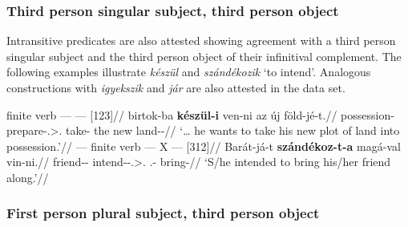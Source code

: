 \subsubsection{Third person singular subject, third person object}\label{sub:3-3}

Intransitive predicates are also attested showing agreement with a third person
singular subject and the third person object of their infinitival complement.
The following examples illustrate \emph{készül} and \emph{szándékozik}
\enquote*{to intend}. Analogous constructions with \emph{igyekszik} and
\emph{jár} are also attested in the data set.

\ex\label{ex:birtok}%
    \begingl
        \glpreamble finite verb --- \Inf{} --- \Obj{} [123]//
        \gla 	\nogloss{\dots} birtok-ba \textbf{készül-i} ven-ni az új föld-jé-t.//
        \glb 	possession-\Ill{} prepare-\Tsg.\Sbj>\Third.\Obj{} take-\Inf{} the new land-\Tsg-\Acc//
        \glft 	\enquote*{\dots{} he wants to take his new plot of land into possession.}\trailingcitation{}//
    \endgl
\xe
\ex\label{ex:barat-szandek}%
    \begingl
        \glpreamble \Obj{} --- finite verb --- X --- \Inf{} [312]//
        \gla 	Barát-já-t \textbf{szándékoz-t-a} magá-val vin-ni.//
        \glb 	friend-\Tsg-\Acc{} intend-\Pst-\Tsg.\Sbj>\Third.\Obj{} \Refl.\Tsg{}-\Com{} bring-\Inf{}//
        \glft 	\enquote*{S/he intended to bring his/her friend along.}//
    \endgl
\xe

\subsubsection{First person plural subject, third person object}\label{sub:1pl-3}

